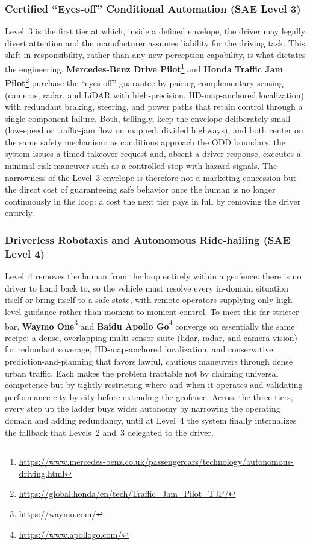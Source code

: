 \subsubsection{Certified ``Eyes-off'' Conditional Automation (SAE Level 3)}
Level~3 is the first tier at which, inside a defined envelope, the driver may legally divert attention and the manufacturer assumes liability for the driving task. This shift in responsibility, rather than any new perception capability, is what dictates the engineering.
\textbf{Mercedes-Benz Drive Pilot}\footnote{\url{https://www.mercedes-benz.co.uk/passengercars/technology/autonomous-driving.html}} and \textbf{Honda Traffic Jam Pilot}\footnote{\url{https://global.honda/en/tech/Traffic_Jam_Pilot_TJP/}} purchase the ``eyes-off'' guarantee by pairing complementary sensing (cameras, radar, and LiDAR with high-precision, HD-map-anchored localization) with redundant braking, steering, and power paths that retain control through a single-component failure.
Both, tellingly, keep the envelope deliberately small (low-speed or traffic-jam flow on mapped, divided highways), and both center on the same safety mechanism: as conditions approach the ODD boundary, the system issues a timed takeover request and, absent a driver response, executes a minimal-risk maneuver such as a controlled stop with hazard signals.
The narrowness of the Level~3 envelope is therefore not a marketing concession but the direct cost of guaranteeing safe behavior once the human is no longer continuously in the loop: a cost the next tier pays in full by removing the driver entirely.

\subsubsection{Driverless Robotaxis and Autonomous Ride-hailing (SAE Level 4)}
Level~4 removes the human from the loop entirely within a geofence: there is no driver to hand back to, so the vehicle must resolve every in-domain situation itself or bring itself to a safe state, with remote operators supplying only high-level guidance rather than moment-to-moment control.
To meet this far stricter bar, \textbf{Waymo One}\footnote{\url{https://waymo.com/}} and \textbf{Baidu Apollo Go}\footnote{\url{https://www.apollogo.com/}} converge on essentially the same recipe: a dense, overlapping multi-sensor suite (lidar, radar, and camera vision) for redundant coverage, HD-map-anchored localization, and conservative prediction-and-planning that favors lawful, cautious maneuvers through dense urban traffic.
Each makes the problem tractable not by claiming universal competence but by tightly restricting where and when it operates and validating performance city by city before extending the geofence.
Across the three tiers, every step up the ladder buys wider autonomy by narrowing the operating domain and adding redundancy, until at Level~4 the system finally internalizes the fallback that Levels~2 and~3 delegated to the driver.



